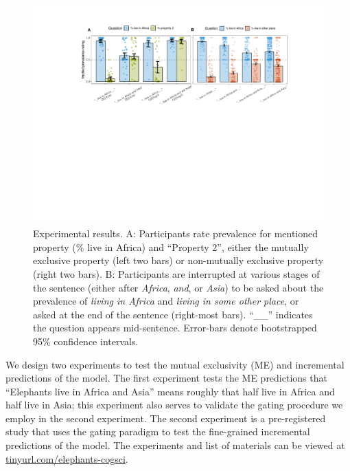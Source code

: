 \documentclass[letterpaper, 12pt]{article}
\begin{document}
\begin{figure}[t]
  \begin{center}
    \includegraphics[width=\textwidth]{xprag}
  \end{center}
  \vspace{-0.45cm}
  \caption{\small Experimental results. A: Participants rate prevalence for mentioned property (\% live in Africa) and ``Property 2'', either the mutually exclusive property (left two bars) or non-mutually exclusive property (right two bars).  B: Participants are interrupted at various stages of the sentence (either after \emph{Africa}, \emph{and}, or \emph{Asia}) to be asked about the prevalence of \emph{living in Africa} and \emph{living in some other place}, or asked at the end of the sentence (right-most bars). ``\_\_'' indicates the question appears mid-sentence. Error-bars denote bootstrapped 95\% confidence intervals.}
  \label{fig:results}
\end{figure}

We design two experiments to test the mutual exclusivity (ME) and incremental predictions of the model. 
The first experiment tests the ME predictions that ``Elephants live in Africa and Asia'' means roughly that half live in Africa and half live in Asia; this experiment also serves to validate the gating procedure we employ in the second experiment. 
The second experiment is a pre-registered study that uses the gating paradigm to test the fine-grained incremental predictions of the model.
The experiments and list of materials can be viewed at \url{tinyurl.com/elephants-cogsci}.
\end{document}
